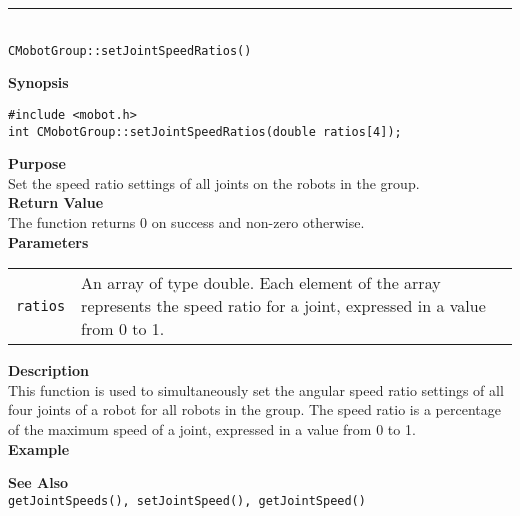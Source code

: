 \noindent
\vspace{5pt}
\rule{4.5in}{0.015in}\\
\noindent
{\LARGE \texttt{CMobotGroup::setJointSpeedRatios()}}\\
{}

\noindent
{\bf Synopsis}
\vspace{-8pt}
\begin{verbatim}
#include <mobot.h>
int CMobotGroup::setJointSpeedRatios(double ratios[4]);
\end{verbatim}

\noindent
{\bf Purpose}\\
Set the speed ratio settings of all joints on the robots in the group.\\

\noindent
{\bf Return Value}\\
The function returns 0 on success and non-zero otherwise.\\

\noindent
{\bf Parameters}
\vspace{-0.1in}
\begin{description}
\item               
\begin{tabular}{p{10 mm}p{145 mm}}
\texttt{ratios} & An array of type double. Each element of the array
represents the speed ratio for a joint, expressed in a value from 0 to 1. \\
\end{tabular}
\end{description}

\noindent
{\bf Description}\\
This function is used to simultaneously set the angular speed ratio settings of
all four joints of a robot for all robots in the group. The speed ratio is a percentage of the maximum
speed of a joint, expressed in a value from 0 to 1.\\

\noindent
{\bf Example}\\
\noindent

\noindent
{\bf See Also}\\
\texttt{getJointSpeeds(), setJointSpeed(), getJointSpeed()}

